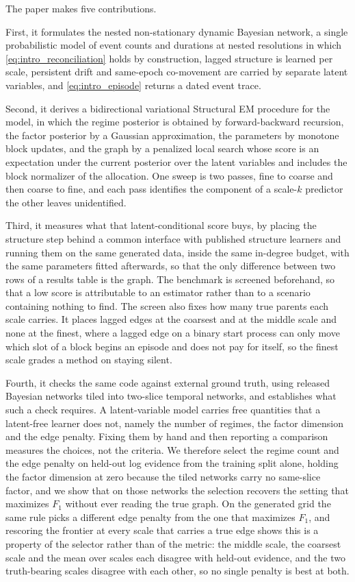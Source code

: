 The paper makes five contributions.

First, it formulates the nested non-stationary dynamic Bayesian network, a single
probabilistic model of event counts and durations at nested resolutions in which
\cref{eq:intro_reconciliation} holds by construction, lagged structure is learned
per scale, persistent drift and same-epoch co-movement are carried by separate
latent variables, and \cref{eq:intro_episode} returns a dated event trace.

Second, it derives a bidirectional variational Structural EM procedure for the
model, in which the regime posterior is obtained by forward-backward recursion,
the factor posterior by a Gaussian approximation, the parameters by monotone
block updates, and the graph by a penalized local search whose score is an
expectation under the current posterior over the latent variables and includes
the block normalizer of the allocation. One sweep is two passes, fine to coarse
and then coarse to fine, and each pass identifies the component of a scale-$k$
predictor the other leaves unidentified.

Third, it measures what that latent-conditional score buys, by placing the
structure step behind a common interface with published structure learners and
running them on the same generated data, inside the same in-degree budget, with
the same parameters fitted afterwards, so that the only difference between two
rows of a results table is the graph. The benchmark is screened beforehand, so
that a low score is attributable to an estimator rather than to a scenario
containing nothing to find. The screen also fixes how many true parents each
scale carries. It places lagged edges at the coarsest and at the middle scale
and none at the finest, where a lagged edge on a binary start process can only
move which slot of a block begins an episode and does not pay for itself, so
the finest scale grades a method on staying silent.

Fourth, it checks the same code against external ground truth, using released
Bayesian networks tiled into two-slice temporal networks, and establishes what
such a check requires. A latent-variable model carries free quantities that a
latent-free learner does not, namely the number of regimes, the factor
dimension and the edge penalty. Fixing them by hand and then reporting a
comparison measures the choices, not the criteria. We therefore select the
regime count and the edge penalty on held-out log evidence from the training
split alone, holding the factor dimension at zero because the tiled networks
carry no same-slice factor, and we show that on those networks the selection
recovers the setting that maximizes $F_1$ without ever reading the true graph.
On the generated grid the same rule picks a different edge penalty from the one
that maximizes $F_1$, and rescoring the frontier at every scale that carries a
true edge shows this is a property of the selector rather than of the metric:
the middle scale, the coarsest scale and the mean over scales each disagree with
held-out evidence, and the two truth-bearing scales disagree with each other, so
no single penalty is best at both.

